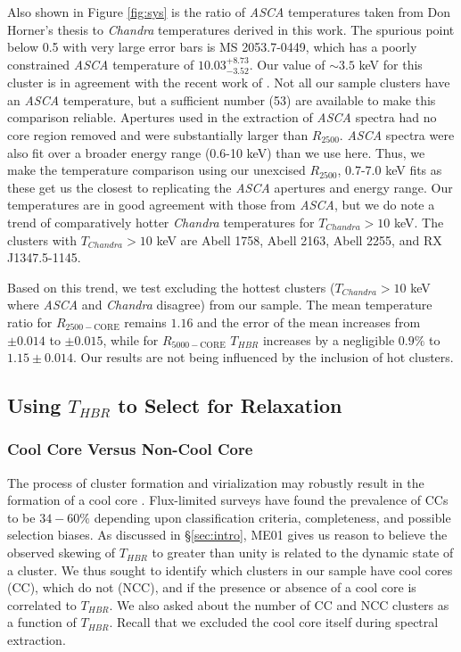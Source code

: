 \documentclass[12pt,preprint]{aastex}
\begin{document}
Also shown in Figure \ref{fig:sys} is the ratio of {\it ASCA}
temperatures taken from Don Horner's thesis to {\it Chandra}
temperatures derived in this work. The spurious point below 0.5 with
very large error bars is MS 2053.7-0449, which has a poorly
constrained {\it ASCA} temperature of $10.03^{+8.73}_{-3.52}$. Our value of
$\sim 3.5$ keV for this cluster is in agreement with the recent work of
\cite{2007astro.ph..3156M}. Not all our sample clusters have an {\it ASCA}
temperature, but a sufficient number (53) are available to make this
comparison reliable. Apertures used in the extraction of {\it ASCA} spectra
had no core region removed and were substantially larger than
$R_{2500}$. {\it ASCA} spectra were also fit over a broader energy range
(0.6-10 keV) than we use here. Thus, we make the temperature
comparison using our unexcised $R_{2500}$, 0.7-7.0 keV fits as
these get us the closest to replicating the {\it ASCA} apertures and energy
range. Our temperatures are in good agreement with those from {\it ASCA},
but we do note a trend of comparatively hotter {\it Chandra} temperatures for
$T_{Chandra} > 10$ keV. The clusters with $T_{Chandra} > 10$ keV are
Abell 1758, Abell 2163, Abell 2255, and RX J1347.5-1145.

Based on this trend, we test excluding the hottest clusters
($T_{Chandra} > 10$ keV where {\it ASCA} and {\it Chandra} disagree) from our sample.
The mean temperature ratio for $R_{2500-\mathrm{CORE}}$ remains $1.16$ and the error
of the mean increases from $\pm 0.014$ to $\pm 0.015$, while for $R_{5000-\mathrm{CORE}}$
$T_{HBR}$ increases by a negligible $0.9\%$ to $1.15\pm 0.014$. Our results
are not being influenced by the inclusion of hot clusters.

\subsection{Using $T_{HBR}$ to Select for Relaxation} \label{sec:relax}

\subsubsection{Cool Core Versus Non-Cool Core}\label{sec:ccncc}

The process of cluster formation and virialization may robustly result
in the formation of a cool core
\citep{2006ApJ...640..673O,2007arXiv0708.1954B}. Flux-limited surveys
have found the prevalence of CCs to be $34-60\%$ \citep{1997MNRAS.292..419W,
1998MNRAS.298..416P, 2005MNRAS.359.1481B, 2007A&A...466..805C}
depending upon classification criteria, completeness, and possible
selection biases. As discussed in \S\ref{sec:intro}, ME01 gives us
reason to believe the observed skewing of $T_{HBR}$ to greater than unity is
related to the dynamic state of a cluster. We thus sought to identify
which clusters in our sample have cool cores (CC), which do not (NCC),
and if the presence or absence of a cool core is correlated to $T_{HBR}$. We
also asked about the number of CC and NCC clusters as a function of
$T_{HBR}$. Recall that we excluded the cool core itself during spectral
extraction.
\end{document}
